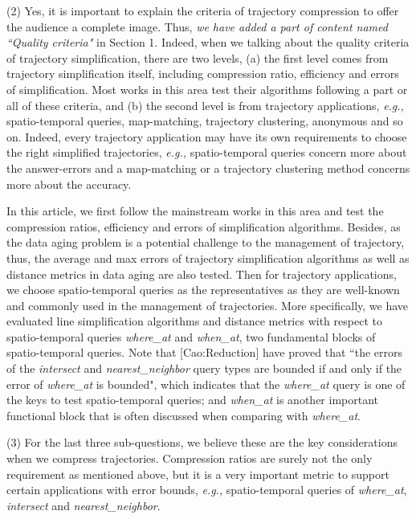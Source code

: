 \documentclass{letter}
\newcommand{\eg}{\emph{e.g.,}\xspace}
\begin{document}
(2) {Yes, it is important to explain the criteria of trajectory compression to offer the audience a complete image.} Thus, \emph{we have added a part of content named ``Quality criteria"} in Section 1. Indeed, when we talking about the quality criteria of trajectory simplification, there are two levels,
(a) the first level comes from trajectory simplification itself, including compression ratio, efficiency and errors of simplification. Most works in this area test their algorithms following a part or all of these criteria, and
(b) the second level is from trajectory applications, \eg spatio-temporal queries, map-matching, trajectory clustering, anonymous and so on. Indeed, every trajectory application may have its own requirements to choose the right simplified trajectories, \eg spatio-temporal queries concern more about the answer-errors and a map-matching or a trajectory clustering method concerns more about the accuracy.

In this article, we first follow the mainstream works in this area and test the compression ratios, efficiency and errors of simplification algorithms.
Besides, as the data aging problem is a potential challenge to the management of trajectory, thus, the average and max errors of trajectory simplification algorithms as well as distance metrics in data aging are also tested.
%
Then for trajectory applications, we choose spatio-temporal queries as the representatives as they are well-known and commonly used in the management of trajectories.
More specifically, we have evaluated line simplification algorithms and distance metrics with respect to spatio-temporal queries \emph{where\_at} and \emph{when\_at}, two fundamental blocks of spatio-temporal queries. Note that [Cao:Reduction] have proved that ``the errors of the \emph{intersect} and \emph{nearest\_neighbor} query types are bounded if and only if the error of \emph{where\_at} is bounded", which indicates that the \emph{where\_at} query is one of the keys to test spatio-temporal queries; and \emph{when\_at} is another important functional block that is often discussed when comparing with \emph{where\_at}.

(3) For the last three sub-questions, we believe these are the key considerations when we compress trajectories. Compression ratios are surely not the only requirement as mentioned above, but it is a very important metric to support certain applications with error bounds, \eg spatio-temporal queries of \emph{where\_at}, \emph{intersect} and \emph{nearest\_neighbor}.
\end{document}
